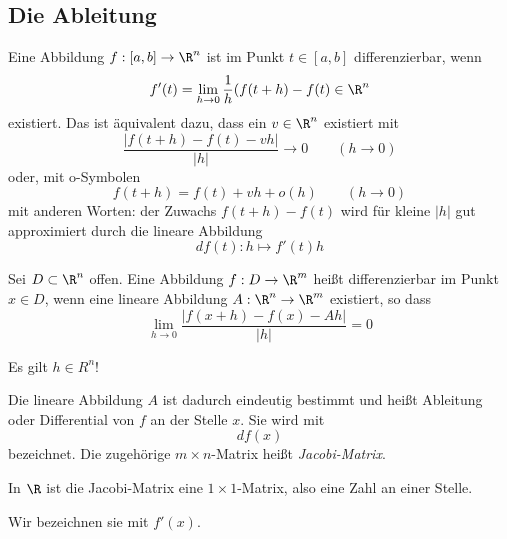 \documentclass[a4paper,10pt]{scrartcl}
\begin{document}
\subsection{Die Ableitung}

Eine Abbildung $f:[a,b]\to\R^n$ ist im Punkt $t\in[a,b]$ differenzierbar, wenn
\[
f'(t)=\lim_{h\to 0}\frac 1h (f(t+h)-f(t) \in \R^n
\]
existiert.
Das ist äquivalent dazu, dass ein $v\in\R^n$ existiert mit
\[
\frac{|f(t+h)-f(t)-vh|}{|h|}\to 0 \qquad (h\to 0)
\]
oder, mit o-Symbolen
\[
f(t+h)=f(t)+vh+o(h) \qquad (h\to 0)
\]
mit anderen Worten: der Zuwachs $f(t+h)-f(t)$ wird für kleine $|h|$ gut approximiert durch die lineare Abbildung
\[
df(t): h\mapsto f'(t)h
\]

\begin{df}
Sei $D\subset \R^n$ offen.
Eine Abbildung $f:D\to \R^m$ heißt differenzierbar im Punkt $x\in D$, wenn eine lineare Abbildung $A:\R^n\to\R^m$ existiert, so dass 
\[
\boxed{\lim_{h\to 0}\frac {|f(x+h)-f(x)-Ah|}{|h|}=0}
\]
\begin{note}
Es gilt $h\in R^n$!
\end{note}
Die lineare Abbildung $A$ ist dadurch eindeutig bestimmt und heißt Ableitung oder Differential von $f$ an der Stelle $x$.
Sie wird mit
\[
df(x)
\]
bezeichnet.
Die zugehörige $m\times n$-Matrix heißt \emph{Jacobi-Matrix}.
\begin{note}
In $\R$ ist die Jacobi-Matrix eine $1\times 1$-Matrix, also eine Zahl an einer Stelle.
\end{note}


Wir bezeichnen sie mit $f'(x)$.
\end{df}
\end{document}
